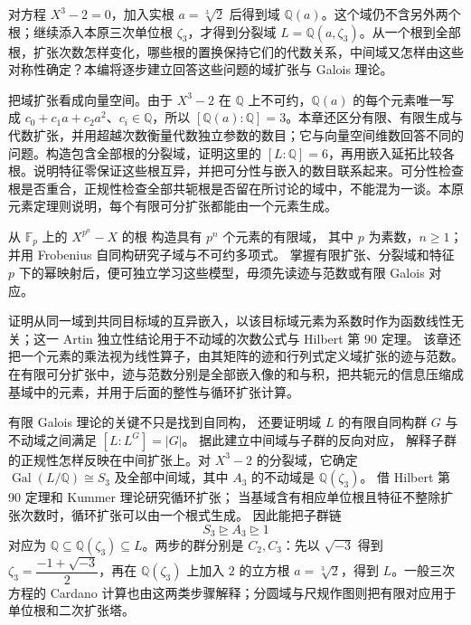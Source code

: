 
\BookPartGuide
对方程 \(X^3-2=0\)，加入实根 \(a=\sqrt[3]{2}\) 后得到域 \(\mathbb Q(a)\)。这个域仍不含另外两个根；继续添入本原三次单位根 \(\zeta_3\)，才得到分裂域 \(L=\mathbb Q(a,\zeta_3)\)。从一个根到全部根，扩张次数怎样变化，哪些根的置换保持它们的代数关系，中间域又怎样由这些对称性确定？本编将逐步建立回答这些问题的域扩张与 Galois 理论。

\ProseParagraphBreak
{}把域扩张看成向量空间。由于 \(X^3-2\) 在 \(\mathbb Q\) 上不可约，\(\mathbb Q(a)\) 的每个元素唯一写成 \(c_0+c_1a+c_2a^2\)、\(c_i\in\mathbb Q\)，所以 \([\mathbb Q(a):\mathbb Q]=3\)。本章还区分有限、有限生成与代数扩张，并用超越次数衡量代数独立参数的数目；它与向量空间维数回答不同的问题。构造包含全部根的分裂域，证明这里的 \([L:\mathbb Q]=6\)，再用嵌入延拓比较各根。说明特征零保证这些根互异，并把可分性与嵌入的数目联系起来。可分性检查根是否重合，正规性检查全部共轭根是否留在所讨论的域中，不能混为一谈。本原元素定理则说明，每个有限可分扩张都能由一个元素生成。

\ProseParagraphBreak
{}从 \(\mathbb F_p\) 上的 \(X^{p^n}-X\) 的根 构造具有 \(p^n\) 个元素的有限域， 其中 \(p\) 为素数，\(n\geq1\)； 并用 Frobenius 自同构研究子域与不可约多项式。 掌握有限扩张、分裂域和特征 \(p\) 下的幂映射后，便可独立学习这些模型，毋须先读迹与范数或有限 Galois 对应。

\ProseParagraphBreak
{}证明从同一域到共同目标域的互异嵌入，以该目标域元素为系数时作为函数线性无关；这一 Artin 独立性结论用于不动域的次数公式与 Hilbert 第 90 定理。 该章还把一个元素的乘法视为线性算子，由其矩阵的迹和行列式定义域扩张的迹与范数。 在有限可分扩张中，迹与范数分别是全部嵌入像的和与积，把共轭元的信息压缩成基域中的元素，并用于后面的整性与循环扩张计算。

\ProseParagraphBreak
有限 Galois 理论的关键不只是找到自同构， 还要证明域 \(L\) 的有限自同构群 \(G\) 与不动域之间满足 \([L:L^G]=|G|\)。 据此建立中间域与子群的反向对应， 解释子群的正规性怎样反映在中间扩张上。对 \(X^3-2\) 的分裂域，它确定 \(\operatorname{Gal}(L/\mathbb Q)\cong S_3\) 及全部中间域，其中 \(A_3\) 的不动域是 \(\mathbb Q(\zeta_3)\)。 借 Hilbert 第 90 定理和 Kummer 理论研究循环扩张； 当基域含有相应单位根且特征不整除扩张次数时，循环扩张可以由一个根式生成。 因此能把子群链
\[
	S_3\trianglerighteq A_3\trianglerighteq1
\]
对应为 \(\mathbb Q\subseteq\mathbb Q(\zeta_3)\subseteq L\)。两步的群分别是 \(C_2,C_3\)：先以 \(\sqrt{-3}\) 得到 \(\zeta_3=\dfrac{-1+\sqrt{-3}}2\)，再在 \(\mathbb Q(\zeta_3)\) 上加入 \(2\) 的立方根 \(a=\sqrt[3]2\)，得到 \(L\)。一般三次方程的 Cardano 计算也由这两类步骤解释；分圆域与尺规作图则把有限对应用于单位根和二次扩张塔。

